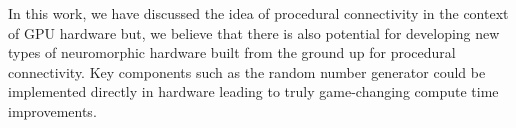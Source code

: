 \documentclass[9pt,twocolumn,twoside,lineno]{pnas-new}
\begin{document}
In this work, we have discussed the idea of procedural connectivity in the context of GPU hardware but, we believe that there is also potential for developing new types of neuromorphic hardware built from the ground up for procedural connectivity.
Key components such as the random number generator could be implemented directly in hardware leading to truly game-changing compute time improvements.
%
\end{document}
